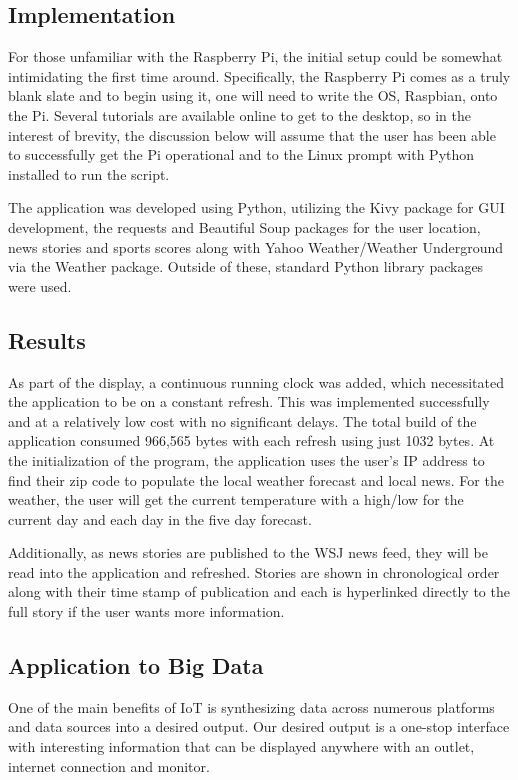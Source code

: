 \documentclass[sigconf]{acmart}
\begin{document}
\subsection{Implementation}
For those unfamiliar with the Raspberry Pi, the initial setup could be somewhat intimidating the first time around. Specifically, the Raspberry Pi comes as a truly blank slate and to begin using it, one will need to write the OS, Raspbian, onto the Pi. Several tutorials are available online to get to the desktop, so in the interest of brevity, the discussion below will assume that the user has been able to successfully get the Pi operational and to the Linux prompt with Python installed to run the script.

The application was developed using Python, utilizing the Kivy package for GUI development, the requests and Beautiful Soup packages for the user location, news stories and sports scores along with Yahoo Weather/Weather Underground via the Weather package. Outside of these, standard Python library packages were used. 

\subsection{Results}
As part of the display, a continuous running clock was added, which necessitated the application to be on a constant refresh. This was implemented successfully and at a relatively low cost with no significant delays. The total build of the application consumed 966,565 bytes with each refresh using just 1032 bytes. 
At the initialization of the program, the application uses the user's IP address to find their zip code to populate the local weather forecast and local news. For the weather, the user will get the current temperature with a high/low for the current day and each day in the five day forecast.

Additionally, as news stories are published to the WSJ news feed, they will be read into the application and refreshed. Stories are shown in chronological order along with their time stamp of publication and each is hyperlinked directly to the full story if the user wants more information. 

\subsection{Application to Big Data}
One of the main benefits of IoT is synthesizing data across numerous platforms and data sources into a desired output. Our desired output is a one-stop interface with interesting information that can be displayed anywhere with an outlet, internet connection and monitor. 
\end{document}
